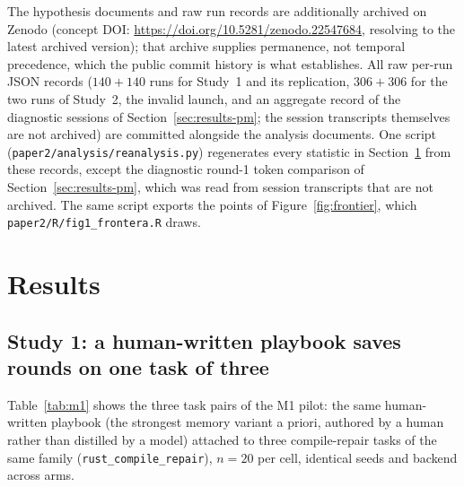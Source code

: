 \documentclass[smallcondensed,natbib]{svjour3}
\begin{document}
The hypothesis documents and raw run records are additionally
archived on Zenodo
(concept DOI: \url{https://doi.org/10.5281/zenodo.22547684},
resolving to the latest archived version); that archive
supplies permanence,
not temporal precedence, which the public commit history is what
establishes. All raw per-run JSON records ($140+140$ runs for
Study~1 and its replication, $306+306$ for the two runs of Study~2,
the invalid launch, and an aggregate record
of the diagnostic sessions of Section~\ref{sec:results-pm}; the
session transcripts themselves are not archived) are committed
alongside the analysis documents. One script
(\texttt{paper2/analysis/reanalysis.py}) regenerates every statistic
in Section~\ref{sec:results} from these records, except the
diagnostic round-1 token comparison of Section~\ref{sec:results-pm},
which was read from session transcripts that are not archived. The
same script exports the points of Figure~\ref{fig:frontier}, which
\texttt{paper2/R/fig1\_frontera.R} draws.

\section{Results}\label{sec:results}

\subsection{Study 1: a human-written playbook saves rounds on one task of
three}\label{sec:results-m1}

Table~\ref{tab:m1} shows the three task pairs of the M1 pilot: the
same human-written playbook (the strongest memory variant a priori,
authored by a human rather than distilled by a model) attached to
three compile-repair tasks of the same family
(\texttt{rust\_compile\_repair}), $n=20$ per cell, identical seeds and
backend across arms.
\end{document}
